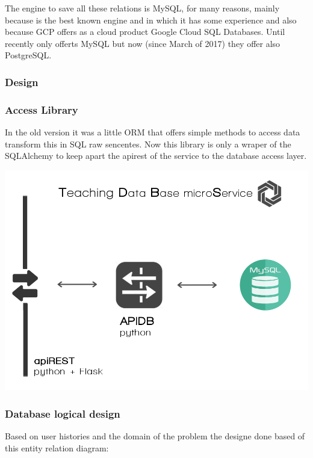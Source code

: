 The engine to save all these relations is MySQL, for many reasons,
mainly because is the best known engine and in which it has some experience
and also because GCP offers as a cloud product Google Cloud SQL Databases.
Until recently only offerts MySQL but now (since March of 2017) they
offer also PostgreSQL.

\subsubsection{Design}






\subsubsection{Access Library}

In the old version it was a little ORM that offers simple methods
to access data transform this in SQL raw sencentes. Now this library
is only a wraper of the SQLAlchemy to keep apart the apirest of the
service to the database access layer.

\begin{center}
\includegraphics[scale=0.35]{img/graphics/tdbms.png}
\end{center}

\subsubsection{Database logical design}

Based on user histories and the domain of the problem the designe
done based of this entity relation diagram:

